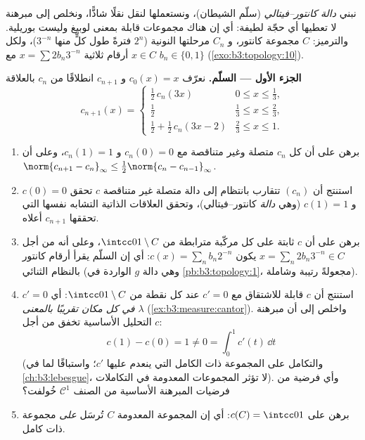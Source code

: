 \begin{problem}
\label{pb:b3:measure:1}
نبني \emph{دالة كانتور--فيتالي} (سلّم الشيطان)، ونستعملها لنقل
 نقلًا شاذًّا، ونخلص إلى مبرهنة لا تعطيها أي حجّة لطيفة:
أي إن هناك مجموعات قابلة  بمعنى لوبيغ وليست بوريلية.
والترميز: $C$ مجموعة كانتور، و $C_n$ مرحلتها النونية ($2^n$
فترةً طول كلٍّ منها $3^{-n}$)، ولكل $x \in C$ أرقام ثلاثية
$x = \sum 2b_n3^{-n}$ مع $b_n \in \{0,1\}$ (\cref{exo:b3:topology:10}).

\medskip
\noindent\textbf{الجزء الأول --- السلّم.} نعرّف $c_0(x) = x$
و $c_{n+1}$ انطلاقًا من $c_n$ بالعلاقة
\[
c_{n+1}(x) = \begin{cases}
\tfrac12\,c_n(3x) & 0 \leq x \leq \tfrac13,\\[2pt]
\tfrac12 & \tfrac13 \leq x \leq \tfrac23,\\[2pt]
\tfrac12 + \tfrac12\,c_n(3x - 2) & \tfrac23 \leq x \leq 1.
\end{cases}
\]
\begin{enumerate}
  \item برهن على أن كل $c_n$ متصلة وغير متناقصة مع $c_n(0) = 0$
        و $c_n(1) = 1$، وعلى أن $\norm{c_{n+1} - c_n}_\infty \leq
        \tfrac12\norm{c_n - c_{n-1}}_\infty$.
  \item استنتج أن $(c_n)$ تتقارب بانتظام إلى دالة متصلة غير
        متناقصة $c$ تحقق $c(0) = 0$ و $c(1) = 1$ (وهي
        \emph{دالة} كانتور--فيتالي)، وتحقق العلاقات الذاتية
        التشابه نفسها التي تحققها $c_{n+1}$ أعلاه.
  \item برهن على أن $c$ ثابتة على كل مركّبة مترابطة من $\intcc01\setminus C$،
        وعلى أنه من أجل $x = \sum_n
        2b_n3^{-n} \in C$ يكون $c(x) = \sum_n b_n2^{-n}$: أي إن السلّم يقرأ
        أرقام كانتور بالنظام الثنائي (وهي دالة $g$ الواردة في
        \cref{pb:b3:topology:1}، مجعولةً رتيبة وشاملة).
  \item استنتج أن $c$ قابلة للاشتقاق مع $c' = 0$ عند كل نقطة من
        $\intcc01\setminus C$: أي $c' = 0$ \emph{في كل مكان تقريبًا بالمعنى
        $\lambda$} (\cref{ex:b3:measure:cantor}). واخلص إلى أن مبرهنة التحليل
        الأساسية تخفق من أجل $c$:
        \[
        c(1) - c(0) = 1 \neq 0 = \int_0^1 c'(t)\,\dd t
        \]
        (والتكامل على المجموعة ذات  الكامل التي ينعدم
        عليها $c'$؛ واستباقًا لما في \cref{ch:b3:lebesgue}، لا تؤثر المجموعات
        المعدومة  في التكاملات). وأي فرضية من فرضيات
        المبرهنة الأساسية من الصنف $\mathcal C^1$ خُولفت؟
  \item برهن على $c(C) = \intcc01$: أي إن المجموعة المعدومة  $C$
        تُرسَل \emph{على} مجموعة ذات  كامل.
\end{enumerate}


\end{problem}
